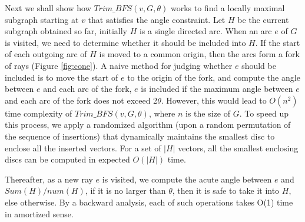 Next we shall show how $Trim\_BFS(v, G, \theta)$ works to find a locally maximal subgraph starting at $v$ that satisfies the angle constraint. Let $H$ be the current subgraph obtained so far, initially $H$ is a single directed arc. When an arc $e$ of $G$ is visited, we need to determine whether it should be included into $H$. If the start of each outgoing arc of $H$ is moved to a common origin, then the arcs form a fork of rays (Figure \ref{fig:cone}). A naive method for judging whether $e$ should be included is to move the start of $e$ to the origin of the fork, and compute the angle between $e$ and each arc of the fork, $e$ is included if the maximum angle between $e$ and each arc of the fork does not exceed 2$\theta$. However, this would lead to $O(n^{2})$ time complexity of $Trim\_BFS(v, G, \theta)$, where $n$ is the size of $G$. To speed up this process, we apply a randomized algorithm (upon a random permutation of the sequence of insertions) that dynamically maintains the smallest disc to enclose all the inserted vectors. For a set of $|H|$ vectors, all the smallest enclosing discs can be computed in expected $O(|H|)$ time. {\color{red}{de Berg M, van Kreveld M, Overmars M, Schwarzkopf O. Computational geometry: algorithms and applications. 3rd ed. Berlin, Germany: Springer-Verlag; 2008.}

Thereafter, as a new ray $e$ is visited, we compute the acute angle between $e$ and $Sum(H)/num(H)$, if it is no larger than $\theta$, then it is safe to take it into $H$, else otherwise. By a backward analysis, each of such operations takes O(1) time in amortized sense.

}
